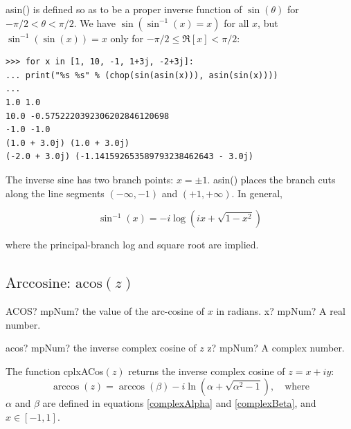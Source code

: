 asin() is defined so as to be a proper inverse function of $\sin(\theta)$ for $-\pi/2 < \theta < \pi/2$. We have $\sin(\sin^{-1}(x)=x)$ for all $x$, but $\sin^{-1}(\sin(x))=x$ only for $-\pi/2 \le \Re[x]<\pi/2$:

\begin{lstlisting}
>>> for x in [1, 10, -1, 1+3j, -2+3j]:
... print("%s %s" % (chop(sin(asin(x))), asin(sin(x))))
...
1.0 1.0
10.0 -0.5752220392306202846120698
-1.0 -1.0
(1.0 + 3.0j) (1.0 + 3.0j)
(-2.0 + 3.0j) (-1.141592653589793238462643 - 3.0j)
\end{lstlisting}

The inverse sine has two branch points: $x=\pm 1$. asin() places the branch cuts along the line segments $(-\infty,-1)$ and $(+1, +\infty)$. In general, 

\begin{equation}
	\sin^{-1}(x) = -i \log \left(ix + \sqrt{1-x^2} \right) 
\end{equation}

where the principal-branch log and square root are implied.




\newpage
\subsection{\texorpdfstring{$\text{Arccosine: acos}(z)$}{acos}}
\label{inverse complex cosine}

\begin{mpFunctionsExtract}
	\mpWorksheetFunctionOneNotImplemented
	{ACOS? mpNum? the value of the arc-cosine of $x$ in radians.}
	{x? mpNum? A real number.}
\end{mpFunctionsExtract}

\vspace{0.6cm}


\begin{mpFunctionsExtract}
	\mpFunctionOne
	{acos? mpNum? the inverse complex cosine of $z$}
	{z? mpNum? A complex number.}
\end{mpFunctionsExtract}

\vspace{0.3cm}
The function \textsf{cplxACos$(z)$} returns the inverse complex cosine of $z=x+iy$: 
\begin{equation}
	\arccos(z) = \arccos(\beta) - i \ln \left(\alpha + \sqrt{\alpha^2 -1}\right), \quad \text{where}
\end{equation}
$\alpha$ and $\beta$ are defined in equations \ref{complexAlpha} and \ref{complexBeta}, and $x \in [-1,1]$. 




